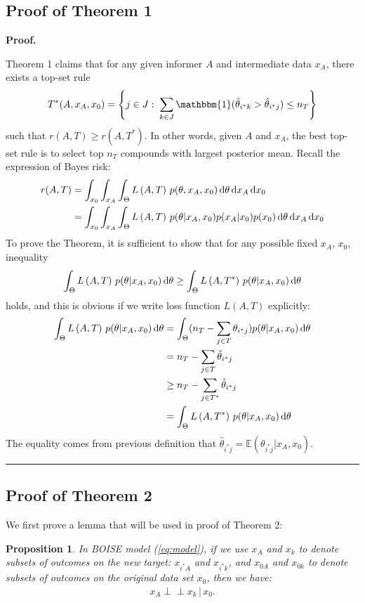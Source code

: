\documentclass[12pt]{article}
\newtheorem{proposition}{Proposition}
\newenvironment{proof}[1][Proof]{\noindent\textbf{#1.} }{\ \rule{0.5em}{0.5em}}
\newcommand{\indep}{\perp \!\!\! \perp}
\begin{document}
\subsection{Proof of Theorem 1}
\begin{proof}

Theorem 1 claims that for any given informer $A$ and intermediate data $x_A$, there exists a top-set rule 
\begin{eqnarray*}
T^*(A,x_A,x_0) = \left\{ j \in J: \; \sum_{k\in J} \mathbbm{1}(\hat \theta_{i^*k} > \hat \theta_{i^*j}) \leq n_T \right\}
\end{eqnarray*}
such that  $r(A,T) \geq r(A, T^*)$. In other words, given $A$ and $x_A$, the best top-set rule is to select top $n_T$ compounds with largest posterior mean. Recall the expression of Bayes risk: 
\begin{align*}
r(A, T) 
&= \int_{x_0} \int_{x_A} \int_\Theta  L\left( A, T \right) \, 
p(\theta, x_A,x_0)\, {\rm d}\theta \, {\rm d} x_A \, {\rm d} x_0\\
&= \int_{x_0} \int_{x_A} \int_\Theta  L\left( A, T \right) \, 
p(\theta |x_A,x_0)p(x_A|x_0)p(x_0)\, {\rm d}\theta \, {\rm d} x_A \, {\rm d} x_0
\end{align*}
To prove the Theorem, it is sufficient to show that for any possible fixed $x_A$, $x_0$, inequality 
\begin{eqnarray}
\label{eq:inequal1}
\int_\Theta  L\left( A, T \right) \, 
p(\theta |x_A,x_0) \, {\rm d}\theta \geq \int_\Theta  L\left( A, T^* \right) \, 
p(\theta |x_A,x_0) \, {\rm d}\theta
\end{eqnarray}holds, and this is obvious if we write loss function $L(A,T)$ explicitly:
\begin{align*}
\int_\Theta  L\left( A, T \right) \, p(\theta |x_A,x_0) \, {\rm d}\theta &= \int_\Theta  ( n_T - \sum_{j\in T} \theta_{i^*j}) 
p(\theta |x_A,x_0) \, {\rm d}\theta\\
&= n_T - \sum_{j\in T} \hat \theta_{i^*j}\\
&\geq n_T - \sum_{j\in T^*}  \hat \theta_{i^*j}\\
&= \int_\Theta  L\left( A, T^* \right) \, 
p(\theta |x_A,x_0) \, {\rm d}\theta
\end{align*}
The equality comes from previous definition that $\hat \theta_{i^*j} = \mathbb E(\theta_{i^*j}|x_A,x_0)$.
\end{proof}

\subsection{Proof of Theorem 2}
We first prove a lemma that will be used in proof of Theorem 2:
\begin{proposition}
In BOISE model (\ref{eq:model}), if we use $x_A$ and $x_k$ to denote subsets of outcomes on the new target: $x_{i^*A}$ and $x_{i^*k}$, and $x_{0A}$ and $x_{0k}$ to denote subsets of outcomes on the original data set $x_0$, then we have:
\begin{eqnarray}
\label{condition_ind}
x_A \indep x_k \, | \, x_0.
\end{eqnarray}
\end{proposition}
\end{document}
